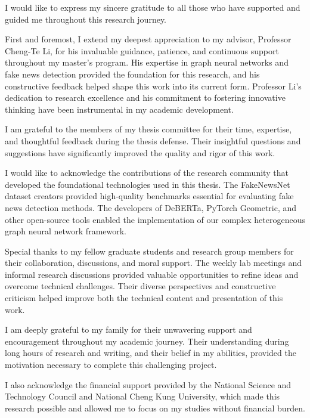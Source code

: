 \StartAcknowledgments

I would like to express my sincere gratitude to all those who have supported and guided me throughout this research journey.

First and foremost, I extend my deepest appreciation to my advisor, Professor Cheng-Te Li, for his invaluable guidance, patience, and continuous support throughout my master's program. His expertise in graph neural networks and fake news detection provided the foundation for this research, and his constructive feedback helped shape this work into its current form. Professor Li's dedication to research excellence and his commitment to fostering innovative thinking have been instrumental in my academic development.

I am grateful to the members of my thesis committee for their time, expertise, and thoughtful feedback during the thesis defense. Their insightful questions and suggestions have significantly improved the quality and rigor of this work.

I would like to acknowledge the contributions of the research community that developed the foundational technologies used in this thesis. The FakeNewsNet dataset creators provided high-quality benchmarks essential for evaluating fake news detection methods. The developers of DeBERTa, PyTorch Geometric, and other open-source tools enabled the implementation of our complex heterogeneous graph neural network framework.

Special thanks to my fellow graduate students and research group members for their collaboration, discussions, and moral support. The weekly lab meetings and informal research discussions provided valuable opportunities to refine ideas and overcome technical challenges. Their diverse perspectives and constructive criticism helped improve both the technical content and presentation of this work.

I am deeply grateful to my family for their unwavering support and encouragement throughout my academic journey. Their understanding during long hours of research and writing, and their belief in my abilities, provided the motivation necessary to complete this challenging project.

I also acknowledge the financial support provided by the National Science and Technology Council and National Cheng Kung University, which made this research possible and allowed me to focus on my studies without financial burden.

